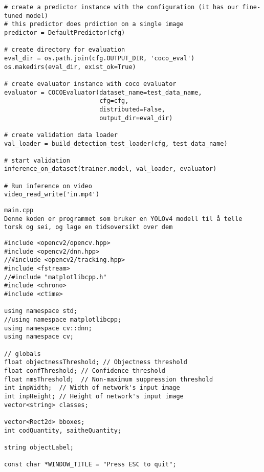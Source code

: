 \begin{verbatim}
# create a predictor instance with the configuration (it has our fine-tuned model)
# this predictor does prdiction on a single image
predictor = DefaultPredictor(cfg)

# create directory for evaluation
eval_dir = os.path.join(cfg.OUTPUT_DIR, 'coco_eval')
os.makedirs(eval_dir, exist_ok=True)

# create evaluator instance with coco evaluator
evaluator = COCOEvaluator(dataset_name=test_data_name,
                          cfg=cfg,
                          distributed=False,
                          output_dir=eval_dir)

# create validation data loader
val_loader = build_detection_test_loader(cfg, test_data_name)

# start validation 
inference_on_dataset(trainer.model, val_loader, evaluator)

# Run inference on video
video_read_write('in.mp4')
\end{verbatim}

\clearpage
\begin{verbatim}
main.cpp
Denne koden er programmet som bruker en YOLOv4 modell til å telle torsk og sei, og lage en tidsoversikt over dem
\end{verbatim}

\label{lst:header}
\begin{verbatim}
#include <opencv2/opencv.hpp>
#include <opencv2/dnn.hpp>
//#include <opencv2/tracking.hpp>
#include <fstream>
//#include "matplotlibcpp.h"
#include <chrono>
#include <ctime>

using namespace std;
//using namespace matplotlibcpp;
using namespace cv::dnn;
using namespace cv;

// globals
float objectnessThreshold; // Objectness threshold
float confThreshold; // Confidence threshold
float nmsThreshold;  // Non-maximum suppression threshold
int inpWidth;  // Width of network's input image
int inpHeight; // Height of network's input image
vector<string> classes;

vector<Rect2d> bboxes;
int codQuantity, saitheQuantity;

string objectLabel;

const char *WINDOW_TITLE = "Press ESC to quit";
\end{verbatim}

